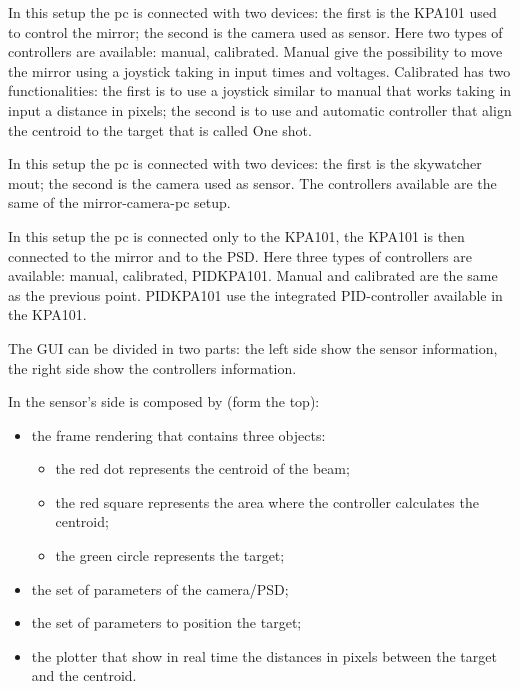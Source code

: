 In this setup the pc is connected with two devices: the first is
the KPA101 used to control the mirror; the second is the camera used as
sensor. Here two types of controllers are available: manual,
calibrated. Manual give the possibility to move the mirror using a joystick taking
in input times and voltages. Calibrated has two functionalities: the first is to use a joystick
similar to manual that works taking in input a distance in pixels; the
second is to use and automatic controller that align the centroid to the
target that is called One shot.

In this setup the pc is connected with two devices: the first is
the skywatcher mout; the second is the camera used as
sensor. The controllers available are the same of the mirror-camera-pc setup.

In this setup the pc is connected only to the KPA101, the KPA101 is
then connected to the mirror and to the PSD. Here three types of controllers are available: manual, calibrated, PIDKPA101. Manual and calibrated are the same as the previous point. PIDKPA101 use the integrated PID-controller available in the KPA101.



The GUI can be divided in two parts: the left side show the sensor
information, the right side show the controllers information.

In the sensor's side is composed by (form the top):

\begin{itemize}
      \item
            the frame rendering that contains three objects:
            \begin{itemize}

                  \item
                        the red dot represents the centroid of the beam;
                  \item
                        the red square represents the area where the controller calculates the
                        centroid;
                  \item
                        the green circle represents the target;
            \end{itemize}

      \item
            the set of parameters of the camera/PSD;
      \item
            the set of parameters to position the target;
      \item
            the plotter that show in real time the distances in pixels between the
            target and the centroid.
\end{itemize}

